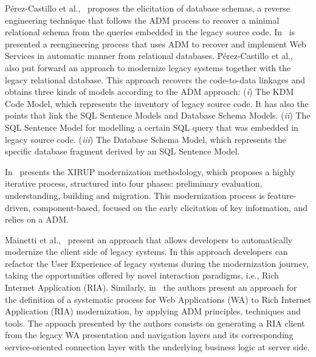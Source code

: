 P\'{e}rez-Castillo et al.,~\cite{ICEISPerez:CastilloGCP12} proposes the elicitation of database schemas, a reverse engineering technique that follows the ADM process to recover a minimal relational schema from the queries embedded in the legacy source code. In~\cite{delCastillo:2009:PRP:1529282.1529753} is presented a reengineering process that uses ADM to recover and implement Web Services in automatic manner from relational databases. P\'{e}rez-Castillo et al.,~\cite{5328801} also put forward an approach to modernize legacy systems together with the legacy relational database. This approach recovers the code-to-data linkages and obtains three kinds of models according to the ADM approach: (\textit{i}) The KDM Code Model, which represents the inventory of legacy source code. It has also the points that link the SQL Sentence Models and Database Schema Models. (\textit{ii}) The SQL Sentence Model for modelling a certain SQL query that was embedded in legacy source code. (\textit{iii}) The Database Schema Model, which represents the specific database fragment derived by an SQL Sentence Model.

In~\cite{FuentesFernandez2012247} presents the XIRUP modernization methodology, which proposes a highly iterative process, structured into four phases: preliminary evaluation, understanding, building and migration. This modernization process is feature-driven, component-based, focused on the early elicitation of key information, and relies on a ADM.

Mainetti et al.,~\cite{Mainetti:2012:MMT:2364120.2364182} present an approach that allows developers to automatically modernize the client side of legacy systems. In this approach developers can refactor the User Experience of legacy systems during the modernization journey, taking the opportunities offered by novel interaction paradigms, i.e., Rich Internet Application (RIA). Similarly, in~\cite{Rodriguez-Echeverria:2011:MLW:2186508.2186536} the authors present an approach for the definition of a systematic process for Web Applications (WA) to Rich Internet Application (RIA) modernization, by applying ADM principles, techniques and tools. The appoach presented by the authors consists on generating a RIA client from the legacy WA presentation and navigation layers and its corresponding service-oriented connection layer with the underlying business logic at server side.

